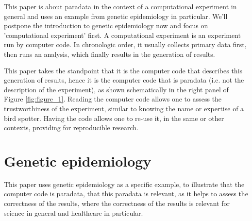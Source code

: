
This paper is about paradata in the context of a computational
experiment in general and uses an example from genetic 
epidemiology in particular.
We'll postpone the introduction to genetic epidemiology now
and focus on 'computational experiment' first.
A computational experiment is an experiment run by computer code.
In chronologic order, it usually collects primary data first, 
then runs an analysis, which finally results in the generation of results.

This paper takes the standpoint that it is the computer code 
that describes this generation of results, 
hence it is the computer code that is paradata (i.e. not the description of the experiment),
as shown schematically in the right panel of Figure \ref{fig:figure_1}.
Reading the computer code allows one to assess the trustworthiness 
of the experiment, similar to knowing the name or expertise of a bird spotter.
Having the code allows one to re-use it, in the same or other contexts,
providing for reproducible research.

\section{Genetic epidemiology}


This paper uses genetic epidemiology as a specific example,
to illustrate that the computer code is paradata,
that this paradata is relevant, as it helps 
to assess the correctness of the results,
where the correctness of the results is relevant for 
science in general and healthcare in particular.


